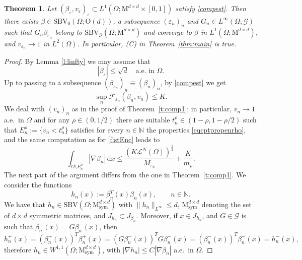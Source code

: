 \documentclass[a4paper,reqno]{amsart}
\newcommand\N{\mathbb{N}}
\newcommand{\SBV}{\mathrm{SBV}}
\newcommand{\SBVG}{\mathrm{SBV}_{\mathcal{G}}}
\newcommand\calL{\mathcal{L}}
\newcommand\eps{{\varepsilon}}
\newtheorem{theorem}[definition]{Theorem}
\theoremstyle{remark}
\def\e{\varepsilon}
\newcommand\dx{{\,\mathrm{d}x}}
\newcommand{\sm}{\setminus}
\newcommand{\F}{\mathcal{F}}
\newcommand{\G}{\mathcal{G}}
\newcommand{\On}{\mathrm{O}(d)}
\newcommand{\Mno}{\mathrm{M}^{d\times d}}
\newcommand{\Mns}{\mathrm{M}^{d\times d}_{\mathrm{sym}}}
\numberwithin{equation}{section}
\begin{document}
\begin{theorem}\label{t:comp2}
	Let $(\beta_\varepsilon, v_\varepsilon)_\varepsilon \subset L^1(\Omega;\Mno \times[0,1])$ satisfy
	\eqref{compest}. Then
	there exists $\beta \in \SBV_0(\Omega; \On)$, a subsequence $({\e_n})_n$ and  $G_n\in L^\infty(\Omega;\G)$ such that
	$G_n\beta_{\e_n}$  belong to $\SBVG(\Omega; \Mno)$ and converge to $\beta$ in $L^1(\Omega;\Mno)$,
	and $v_{\e_n}\to1$ in $L^2(\Omega)$.
	In particular, (C) in Theorem~\ref{thm:main} is true.
\end{theorem}
\begin{proof}
	By Lemma \ref{l:linfty} we may assume that  
	\begin{equation}\label{2904251925}
		|\beta_\varepsilon|\leq \sqrt{d} \quad \text{a.e.\ in }\Omega.
	\end{equation}
	Up to passing to a subsequence $(\beta_{\varepsilon_n})_n\equiv (\beta_n)_n$, by \eqref{compest} we get
	\begin{equation}\label{0305251910}
		\sup_n \F_{\eps_n}(\beta_n, v_n)\leq K.
	\end{equation}
	We deal with $(v_n)_n$ as in the proof of Theorem~\ref{t:comp1}; in particular, $v_n\to1$ a.e.\ in $\Omega$ and 
	for any $\rho\in (0,1/2)$
	there are suitable $t_n^\rho \in (1-\rho,1-\rho/2)$ such that $E_n^\rho:=\{v_n <t_n^\rho\}$ satisfies for every $n\in \N$ the properties \eqref{eqcptpropenrho}, and 
the same computation as for \eqref{f:stEnc}
leads to
	\begin{equation}\label{02401241218'}
	\int_{\Omega\sm E_n^\rho}|\nabla \beta_n| \dx 
	\leq \frac{(K\calL^N(\Omega))^{\frac 12}}{M_{\varepsilon_n}}+\frac{K}{m_\rho}.
\end{equation}
The next part of the argument differs from the one in Theorem~\ref{t:comp1}. We
consider the functions 
\begin{equation}\label{2401241151}
    h_n(x):= \beta_n^T(x) \beta_n(x), \qquad n\in\N.
\end{equation}
We have that $h_n \in \SBV(\Omega;\Mns)$
with $\|h_n\|_{L^\infty}\le d$, $\Mns$ denoting the set of $d\times d$ symmetric matrices, and $J_{h_n} \subset J_{\beta_n}$. Moreover,
if $x\in J_{h_n}$, and $G\in\G$ is such that $\beta^+_n(x)=G\beta^-_n(x)$, then 
\[
h_n^+(x)= \left(\beta_n^+(x)\right)^T\beta_n^+(x)= \left(G\beta_n^-(x)\right)^TG\beta_n^-(x)=  \left(\beta_n^-(x)\right)^T\beta_n^-(x)
=h_n^-(x),
\]
therefore $h_n\in W^{1,1}(\Omega;\Mns)$,
with $|\nabla h_n|\le C |\nabla \beta_n|$ a.e.\ in $\Omega$.
	

\end{proof}
\end{document}

